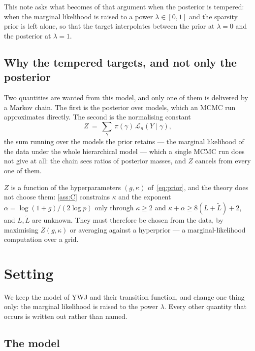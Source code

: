 \documentclass[aos]{imsart}
\newcommand{\Ltil}{\widetilde{L}}
\theoremstyle{plain}
\theoremstyle{definition}
\begin{document}
    This note asks what becomes of that argument when the posterior is
    tempered: when the marginal likelihood is raised to a power
    $\lambda\in[0,1]$ and the sparsity prior is left alone, so that the
    target interpolates between the prior at $\lambda=0$ and the posterior
    at $\lambda=1$.

    \subsection*{Why the tempered targets, and not only the posterior}

    Two quantities are wanted from this model, and only one of them is
    delivered by a Markov chain. The first is the posterior over models,
    which an MCMC run approximates directly. The second is the normalising
    constant
    \begin{equation*}
        Z\ =\ \sum_{\gamma}\ \pi(\gamma)\,
        \mathcal{L}_n(Y\mid\gamma) ,
    \end{equation*}
    the sum running over the models the prior retains ---
    the marginal likelihood of the data under the whole hierarchical model ---
    which a single MCMC run does not give at all: the chain sees ratios of
    posterior masses, and $Z$ cancels from every one of them.

    $Z$ is a function of the hyperparameters $(g,\kappa)$
    of~\eqref{eq:prior}, and the theory does not choose them: \cref{ass:C}
    constrains $\kappa$ and the exponent $\alpha=\log(1+g)/(2\log p)$ only
    through $\kappa\geq2$ and $\kappa+\alpha\geq8(L+\Ltil)+2$, and
    $L,\Ltil$ are unknown.
    They must therefore be chosen from the data, by maximising $Z(g,\kappa)$
    or averaging against a hyperprior --- a marginal-likelihood computation
    over a grid.



    \section{Setting}
    \label{sec:setting}

    We keep the model of YWJ and their transition function, and change one
    thing only: the marginal likelihood is raised to the power $\lambda$.
    Every other quantity that occurs is written out rather than named.

    \subsection{The model}
    \label{sub:model}
\end{document}
